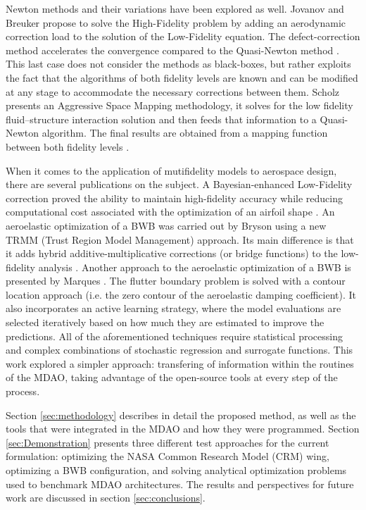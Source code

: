 \documentclass[conf]{new-aiaa}
\begin{document}
Newton methods and their variations have been explored as well. Jovanov and Breuker propose to solve the High-Fidelity problem by adding an aerodynamic correction load to the solution of the Low-Fidelity equation. The defect-correction method accelerates the convergence compared to the Quasi-Newton method \cite{Jovanov2015}. This last case does not consider the methods as black-boxes, but rather exploits the fact that the algorithms of both fidelity levels are known and can be modified at any stage to accommodate the necessary corrections between them. Scholz presents an Aggressive Space Mapping methodology, it solves for the low fidelity fluid–structure interaction solution and then feeds that information to a Quasi-Newton algorithm. The final results are obtained from a mapping function between both fidelity levels \cite{Scholcz2014}. \par
When it comes to the application of mutifidelity models to aerospace design, there are several publications on the subject. A Bayesian-enhanced Low-Fidelity correction proved the ability to maintain high-fidelity accuracy while reducing computational cost associated with the optimization of an airfoil shape \cite{fischer2018bayesian}. An aeroelastic optimization of a BWB was carried out by Bryson \cite{Bryson2019} using a new TRMM (Trust Region Model Management) approach. Its main difference is that it adds hybrid additive-multiplicative corrections (or bridge functions) to the low-fidelity analysis \cite{Bryson2019a}. Another approach to the aeroelastic optimization of a BWB is presented by Marques \cite{Marques2019}. The flutter boundary problem is solved with a contour location approach (i.e. the zero contour of the aeroelastic damping coefficient). It also incorporates an active learning strategy, where the model evaluations are selected iteratively based on how much they are estimated to improve the predictions. 
All of the aforementioned techniques require statistical processing and complex combinations of stochastic regression and surrogate functions. This work explored a simpler approach: transfering of information within the routines of the MDAO, taking advantage of the open-source tools at every step of the process. \par
Section \ref{sec:methodology} describes in detail the proposed method, as well as the tools that were integrated in the MDAO and how they were programmed. Section \ref{sec:Demonstration} presents three different test approaches for the current formulation: optimizing the NASA Common Research Model (CRM) wing, optimizing a BWB configuration, and solving analytical optimization problems used to benchmark MDAO architectures. The results and perspectives for future work are discussed in section \ref{sec:conclusions}. 
\end{document}
